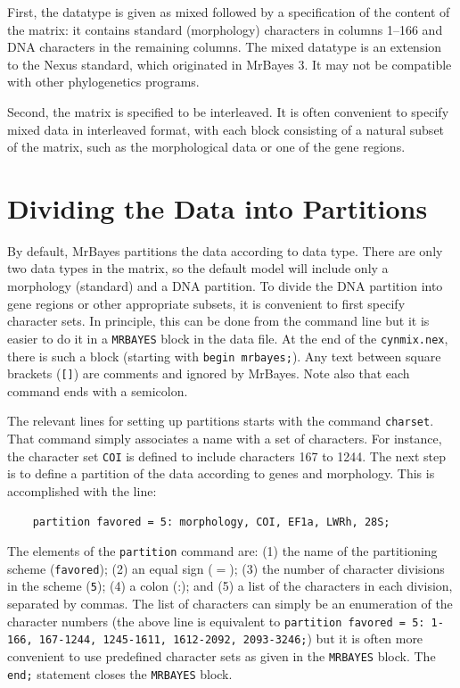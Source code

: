\documentclass[12pt]{book}
\newcommand{\ttt}[1]{\texttt{#1}}
\begin{document}
First, the datatype is given as mixed followed by a specification of the content of the matrix: it
contains standard (morphology) characters in columns 1--166 and DNA characters in the remaining
columns. The mixed datatype is an extension to the Nexus standard, which originated in MrBayes 3.
It may not be compatible with other phylogenetics programs.

Second, the matrix is specified to be interleaved. It is often convenient to specify mixed data in
interleaved format, with each block consisting of a natural subset of the matrix, such as the
morphological data or one of the gene regions.

\section{Dividing the Data into Partitions}

By default, MrBayes partitions the data according to data type. There are only two data types in
the matrix, so the default model will include only a morphology (standard) and a DNA partition. To
divide the DNA partition into gene regions or other appropriate subsets, it is convenient to first
specify character sets. In principle, this can be done from the command line but it is easier to do
it in a \ttt{MRBAYES} block in the data file. At the end of the \ttt{cynmix.nex}, there is such a
block (starting with \ttt{begin mrbayes;}). Any text between square brackets (\ttt{[]}) are
comments and ignored by MrBayes. Note also that each command ends with a semicolon.

The relevant lines for setting up partitions starts with the command \ttt{charset}. That command
simply associates a name with a set of characters. For instance, the character set \ttt{COI} is
defined to include characters 167 to 1244. The next step is to define a partition of the data
according to genes and morphology. This is accomplished with the line:

\begin{singlespacing}
\footnotesize
\begin{verbatim}
    partition favored = 5: morphology, COI, EF1a, LWRh, 28S;
\end{verbatim}
\normalsize
\end{singlespacing}

The elements of the \ttt{partition} command are: (1) the name of the partitioning scheme
(\ttt{favored}); (2) an equal sign ($=$); (3) the number of character divisions in the scheme
(\ttt{5}); (4) a colon (:); and (5) a list of the characters in each division, separated by commas.
The list of characters can simply be an enumeration of the character numbers (the above line is
equivalent to \ttt{partition favored = 5: 1-166, 167-1244, 1245-1611, 1612-2092, 2093-3246;}) but
it is often more convenient to use predefined character sets as given in the \ttt{MRBAYES} block.
The \ttt{end;} statement closes the \ttt{MRBAYES} block.
\end{document}

